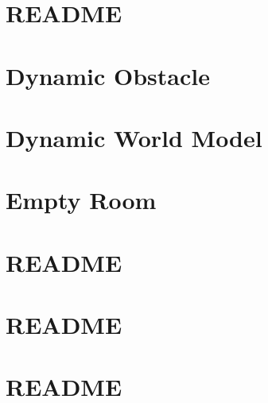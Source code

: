 \let\mypdfximage\pdfximage\def\pdfximage{\immediate\mypdfximage}\documentclass[twoside]{book}
\newcommand{\+}{\discretionary{\mbox{\scriptsize$\hookleftarrow$}}{}{}}
\begin{document}
\chapter{README}
\label{md_smacc2_sm_reference_library_sm_dance_bot_msgs_README}

\chapter{Dynamic Obstacle}
\label{md_smacc2_sm_reference_library_sm_dance_bot_strikes_back_models_dynamic_obstacle_README}

\chapter{Dynamic World Model}
\label{md_smacc2_sm_reference_library_sm_dance_bot_strikes_back_models_dynamic_world_README}

\chapter{Empty Room}
\label{md_smacc2_sm_reference_library_sm_dance_bot_strikes_back_models_empty_room_README}

\chapter{README}
\label{md_smacc2_sm_reference_library_sm_dance_bot_strikes_back_README}

\chapter{README}
\label{md_smacc2_sm_reference_library_sm_ferrari_README}

\chapter{README}
\label{md_smacc2_sm_reference_library_sm_multi_stage_1_README}

\end{document}
